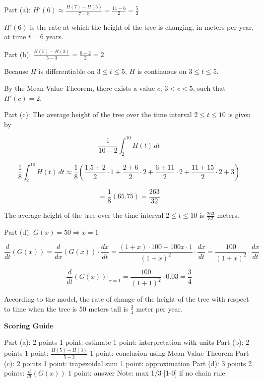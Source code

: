 \documentclass[12pt,addpoints,answers]{exam}
\begin{document}
\begin{questions}
\begin{solution}
Part (a): $H'(6) \approx \frac{H(7) - H(5)}{7-5} = \frac{11-6}{2} = \frac{5}{2}$ \par $H'(6)$ is the rate at which the height of the tree is changing, in meters per year, at time $t = 6$ years. \par Part (b): $\frac{H(5) - H(3)}{5-3} = \frac{6-2}{2} = 2$ \par Because $H$ is differentiable on $3 \le t \le 5$, $H$ is continuous on $3 \le t \le 5$. \par By the Mean Value Theorem, there exists a value $c$, $3 < c < 5$, such that $H'(c) = 2$. \par Part (c): The average height of the tree over the time interval $2 \le t \le 10$ is given by \par $$\frac{1}{10-2}\int_2^{10} H(t)\,dt$$ \par $$\frac{1}{8}\int_2^{10} H(t)\,dt \approx \frac{1}{8}\left(\frac{1.5+2}{2}\cdot 1 + \frac{2+6}{2}\cdot 2 + \frac{6+11}{2}\cdot 2 + \frac{11+15}{2}\cdot 2 + 3\right)$$ \par $$= \frac{1}{8}(65.75) = \frac{263}{32}$$ \par The average height of the tree over the time interval $2 \le t \le 10$ is $\frac{263}{32}$ meters. \par Part (d): $G(x) = 50 \Rightarrow x = 1$ \par $$\frac{d}{dt}(G(x)) = \frac{d}{dx}(G(x)) \cdot \frac{dx}{dt} = \frac{(1+x) \cdot 100 - 100x \cdot 1}{(1+x)^2} \cdot \frac{dx}{dt} = \frac{100}{(1+x)^2} \cdot \frac{dx}{dt}$$ \par $$\frac{d}{dt}(G(x))\bigg|_{x=1} = \frac{100}{(1+1)^2} \cdot 0.03 = \frac{3}{4}$$ \par According to the model, the rate of change of the height of the tree with respect to time when the tree is 50 meters tall is $\frac{3}{4}$ meter per year.
\par\medskip
\textbf{Scoring Guide}\par
Part (a): 2 points 1 point: estimate 1 point: interpretation with units Part (b): 2 points 1 point: $\frac{H(5) - H(3)}{5-3}$ 1 point: conclusion using Mean Value Theorem Part (c): 2 points 1 point: trapezoidal sum 1 point: approximation Part (d): 3 points 2 points: $\frac{d}{dt}(G(x))$ 1 point: answer Note: max 1/3 [1-0] if no chain rule
\end{solution}


\end{questions}
\end{document}
